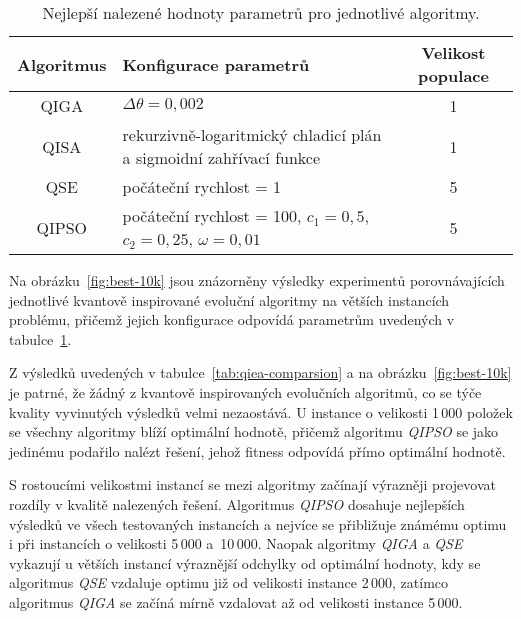 \begin{table}[ht]
    \centering
    \begin{tabularx}{\textwidth}{c X c}
        \toprule
        \textbf{Algoritmus} & \textbf{Konfigurace parametrů} & \textbf{Velikost populace} \\
        \midrule
        QIGA   & $\Delta\theta = 0{,}002$ & 1 \\[1ex]
        QISA   & rekurzivně-logaritmický chladicí plán a sigmoidní zahřívací funkce & 1 \\[1ex]
        QSE    & počáteční rychlost = 1 & 5 \\[1ex]
        QIPSO  & počáteční rychlost = 100, $c_1 = 0{,}5$, $c_2 = 0{,}25$, $\omega = 0{,}01$ & 5 \\
        \bottomrule
    \end{tabularx}
    \caption{Nejlepší nalezené hodnoty parametrů pro jednotlivé algoritmy.}
    \label{tab:best-configs}
\end{table}

Na obrázku~\ref{fig:best-10k} jsou znázorněny výsledky experimentů porovnávajících jednotlivé kvantově inspirované evoluční algoritmy na větších instancích problému, přičemž jejich konfigurace odpovídá parametrům uvedených v tabulce~\ref{tab:best-configs}. 

Z výsledků uvedených v tabulce~\ref{tab:qiea-comparsion} a na obrázku~\ref{fig:best-10k} je patrné, že žádný z kvantově inspirovaných evolučních algoritmů, co se týče kvality vyvinutých výsledků velmi nezaostává. 
U instance o velikosti 1\,000 položek se všechny algoritmy blíží optimální hodnotě, přičemž algoritmu \emph{QIPSO} se jako jedinému podařilo nalézt řešení, jehož fitness odpovídá přímo optimální hodnotě. 

S rostoucími velikostmi instancí se mezi algoritmy začínají výrazněji projevovat rozdíly v kvalitě nalezených řešení. 
Algoritmus \emph{QIPSO} dosahuje nejlepších výsledků ve všech testovaných instancích a nejvíce se přibližuje známému optimu i při instancích o velikosti 5\,000 a~10\,000. 
Naopak algoritmy \emph{QIGA} a \emph{QSE} vykazují u větších instancí výraznější odchylky od optimální hodnoty, kdy se algoritmus \emph{QSE} vzdaluje optimu již od velikosti instance 2\,000, zatímco algoritmus \emph{QIGA} se začíná mírně vzdalovat až od velikosti instance 5\,000. 

